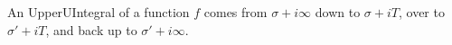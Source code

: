 \begin{definition}[UpperUIntegral]
\label{UpperUIntegral}
\leanok
An UpperUIntegral of a function $f$ comes from
  $\sigma+i\infty$ down to $\sigma+iT$, over to
  $\sigma'+iT$, and back up to $\sigma'+i\infty$.
\end{definition}

